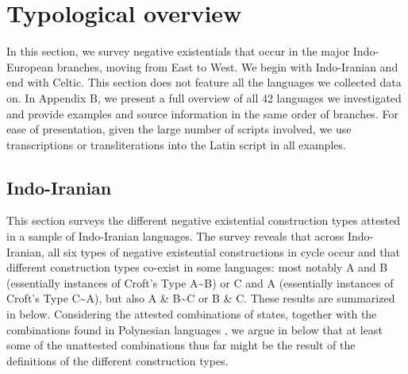\documentclass[output=paper,colorlinks,citecolor=brown]{langscibook}
\begin{document}
\section{Typological overview}\label{sec:ieur-4}

In this section, we survey negative existentials that occur in the major
Indo-European branches, moving from East to West. We begin with
Indo-Iranian and end with Celtic. This section does not feature all the
languages we collected data on. In Appendix B, we present a full overview
of all 42 languages we investigated and provide examples and source
information in the same order of branches. For ease of presentation, given
the large number of scripts involved, we use transcriptions or
transliterations into the Latin script in all examples. 

\subsection{Indo-Iranian}\label{sec:ieur-4.1}

This section surveys the different negative existential construction types
attested in a sample of Indo-Iranian languages. The
survey reveals that across Indo-Iranian, all six types of negative
existential constructions in  cycle occur and that
different construction types co-exist in some languages: most notably A and
B (essentially instances of Croft's Type A{\textasciitilde}B) or C and A
(essentially instances of Croft's Type C{\textasciitilde}A), but also A \&
B{\textasciitilde}C or B \& C. These results are summarized in
 below.
Considering the attested combinations of states, together with the
combinations found in Polynesian languages \citep{Veselinova2014}, we argue
in  below that at least some of the unattested
combinations thus far might be the result of the definitions of the
different construction types. 
\end{document}
